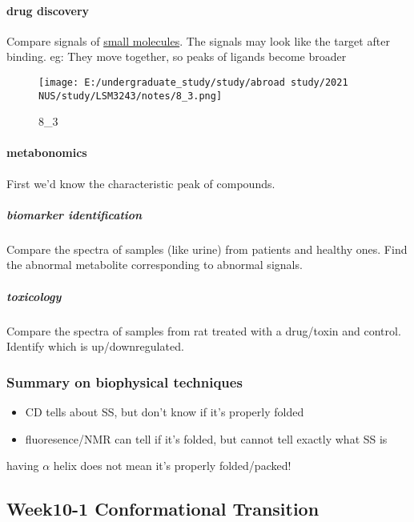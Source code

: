 \documentclass[]{article}
\let\oldparagraph\paragraph
\renewcommand{\paragraph}[1]{\oldparagraph{#1}\mbox{}}
\let\oldsubparagraph\subparagraph
\renewcommand{\subparagraph}[1]{\oldsubparagraph{#1}\mbox{}}
\begin{document}
\hypertarget{drug-discovery}{%
\paragraph{drug discovery}\label{drug-discovery}}

Compare signals of \underline{small molecules}. The signals may look
like the target after binding. eg: They move together, so peaks of
ligands become broader

\begin{figure}
\centering
\texttt{[image: E:/undergraduate\_study/study/abroad study/2021 NUS/study/LSM3243/notes/8\_3.png]}
\caption{8\_3}
\end{figure}

\hypertarget{metabonomics}{%
\paragraph{metabonomics}\label{metabonomics}}

First we'd know the characteristic peak of compounds.

\hypertarget{biomarker-identification}{%
\subparagraph{biomarker identification}\label{biomarker-identification}}

Compare the spectra of samples (like urine) from patients and healthy
ones. Find the abnormal metabolite corresponding to abnormal signals.

\hypertarget{toxicology}{%
\subparagraph{toxicology}\label{toxicology}}

Compare the spectra of samples from rat treated with a drug/toxin and
control. Identify which is up/downregulated.

\hypertarget{summary-on-biophysical-techniques}{%
\subsubsection{Summary on biophysical
techniques}\label{summary-on-biophysical-techniques}}

\begin{itemize}
\item
  CD tells about SS, but don't know if it's properly folded
\item
  fluoresence/NMR can tell if it's folded, but cannot tell exactly what
  SS is
\end{itemize}

having \(\alpha\) helix does not mean it's properly folded/packed!

\hypertarget{week10-1-conformational-transition}{%
\subsection{Week10-1 Conformational
Transition}\label{week10-1-conformational-transition}}
\end{document}

